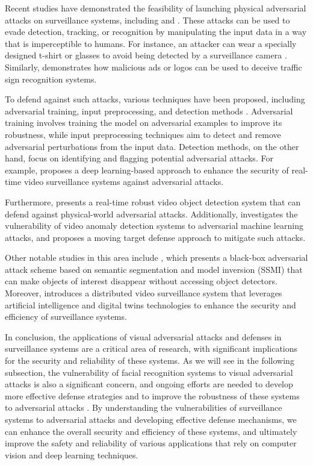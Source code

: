 \documentclass[11pt]{article}
\begin{document}
Recent studies have demonstrated the feasibility of launching physical adversarial attacks on surveillance systems, including \cite{ref11} and \cite{ref63}. These attacks can be used to evade detection, tracking, or recognition by manipulating the input data in a way that is imperceptible to humans. For instance, an attacker can wear a specially designed t-shirt or glasses to avoid being detected by a surveillance camera \cite{ref32}. Similarly, \cite{ref29} demonstrates how malicious ads or logos can be used to deceive traffic sign recognition systems.

To defend against such attacks, various techniques have been proposed, including adversarial training, input preprocessing, and detection methods \cite{ref208}. Adversarial training involves training the model on adversarial examples to improve its robustness, while input preprocessing techniques aim to detect and remove adversarial perturbations from the input data. Detection methods, on the other hand, focus on identifying and flagging potential adversarial attacks. For example, \cite{ref209} proposes a deep learning-based approach to enhance the security of real-time video surveillance systems against adversarial attacks.

Furthermore, \cite{ref210} presents a real-time robust video object detection system that can defend against physical-world adversarial attacks. Additionally, \cite{ref211} investigates the vulnerability of video anomaly detection systems to adversarial machine learning attacks, and \cite{ref33} proposes a moving target defense approach to mitigate such attacks.

Other notable studies in this area include \cite{ref212}, which presents a black-box adversarial attack scheme based on semantic segmentation and model inversion (SSMI) that can make objects of interest disappear without accessing object detectors. Moreover, \cite{ref213} introduces a distributed video surveillance system that leverages artificial intelligence and digital twins technologies to enhance the security and efficiency of surveillance systems.

In conclusion, the applications of visual adversarial attacks and defenses in surveillance systems are a critical area of research, with significant implications for the security and reliability of these systems. As we will see in the following subsection, the vulnerability of facial recognition systems to visual adversarial attacks is also a significant concern, and ongoing efforts are needed to develop more effective defense strategies and to improve the robustness of these systems to adversarial attacks \cite{ref11}. By understanding the vulnerabilities of surveillance systems to adversarial attacks and developing effective defense mechanisms, we can enhance the overall security and efficiency of these systems, and ultimately improve the safety and reliability of various applications that rely on computer vision and deep learning techniques.
\end{document}
